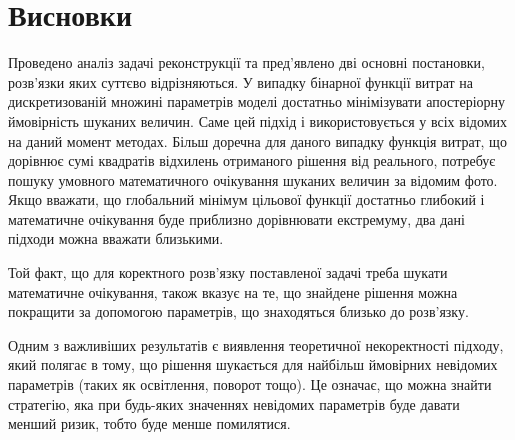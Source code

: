 \section{Висновки}

Проведено аналіз задачі реконструкції та пред'явлено дві основні постановки,
розв'язки яких суттєво відрізняються.
У випадку бінарної функції витрат на дискретизованій множині параметрів моделі
достатньо мінімізувати апостеріорну ймовірність шуканих величин.
Саме цей підхід і використовується у всіх відомих на даний момент методах.
Більш доречна для даного випадку функція витрат,
що дорівнює сумі квадратів відхилень отриманого рішення від реального,
потребує пошуку умовного математичного очікування
шуканих величин за відомим фото.
Якщо вважати,
що глобальний мінімум цільової функції достатньо глибокий
і математичне очікування буде приблизно дорівнювати екстремуму,
два дані підходи можна вважати близькими.

Той факт,
що для коректного розв'язку поставленої задачі треба шукати
математичне очікування,
також вказує на те,
що знайдене рішення можна покращити за допомогою параметрів,
що знаходяться близько до розв'язку.

Одним з важливіших результатів є виявлення теоретичної некоректності підходу,
який полягає в тому,
що рішення шукається для найбільш ймовірних невідомих параметрів
(таких як освітлення, поворот тощо).
Це означає, що можна знайти стратегію,
яка при будь-яких значеннях невідомих параметрів буде давати менший ризик,
тобто буде менше помилятися.
